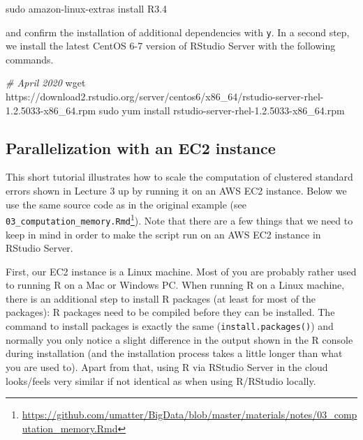 \documentclass[
  12pt,
]{style/krantz}
\newenvironment{Shaded}{\begin{snugshade}}{\end{snugshade}}
\newcommand{\CommentTok}[1]{\textcolor[rgb]{0.56,0.35,0.01}{\textit{#1}}}
\newcommand{\FunctionTok}[1]{\textcolor[rgb]{0.00,0.00,0.00}{#1}}
\newcommand{\NormalTok}[1]{#1}
\renewcommand{\href}[2]{#2\footnote{\url{#1}}}
\begin{document}
\begin{Shaded}
\begin{Highlighting}[]
\FunctionTok{sudo}\NormalTok{ amazon{-}linux{-}extras install R3.4}
\end{Highlighting}
\end{Shaded}

and confirm the installation of additional dependencies with \texttt{y}. In a second step, we install the latest CentOS 6-7 version of RStudio Server with the following commands.

\begin{Shaded}
\begin{Highlighting}[]
\CommentTok{\# April 2020}
\FunctionTok{wget}\NormalTok{ https://download2.rstudio.org/server/centos6/x86\_64/rstudio{-}server{-}rhel{-}1.2.5033{-}x86\_64.rpm}
\FunctionTok{sudo}\NormalTok{ yum install rstudio{-}server{-}rhel{-}1.2.5033{-}x86\_64.rpm}
\end{Highlighting}
\end{Shaded}

\hypertarget{parallelization-with-an-ec2-instance}{%
\subsection{Parallelization with an EC2 instance}\label{parallelization-with-an-ec2-instance}}

This short tutorial illustrates how to scale the computation of clustered standard errors shown in Lecture 3 up by running it on an AWS EC2 instance. Below we use the same source code as in the original example (see \href{https://github.com/umatter/BigData/blob/master/materials/notes/03_computation_memory.Rmd}{\texttt{03\_computation\_memory.Rmd}}). Note that there are a few things that we need to keep in mind in order to make the script run on an AWS EC2 instance in RStudio Server.

First, our EC2 instance is a Linux machine. Most of you are probably rather used to running R on a Mac or Windows PC. When running R on a Linux machine, there is an additional step to install R packages (at least for most of the packages): R packages need to be compiled before they can be installed. The command to install packages is exactly the same (\texttt{install.packages()}) and normally you only notice a slight difference in the output shown in the R console during installation (and the installation process takes a little longer than what you are used to). Apart from that, using R via RStudio Server in the cloud looks/feels very similar if not identical as when using R/RStudio locally.
\end{document}
